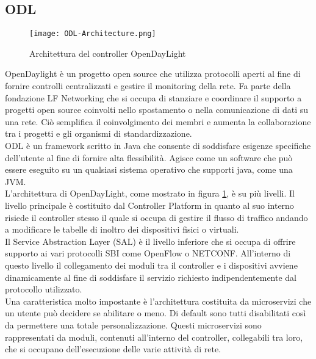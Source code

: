 \subsection{ODL}
\begin{figure}[h]
    \centering
   \texttt{[image: ODL-Architecture.png]}
    \caption{Architettura del controller OpenDayLight}
    \label{fig:ArchODL}
\end{figure}
OpenDaylight\cite{ODL} è un progetto open source che utilizza protocolli aperti al fine di fornire controlli centralizzati e gestire il monitoring della rete.
Fa parte della fondazione LF Networking \cite{LFN} che si occupa di stanziare e coordinare il supporto a progetti open source coinvolti nello spostamento o nella comunicazione di dati su una rete.
Ciò semplifica il coinvolgimento dei membri e aumenta la collaborazione tra i progetti e gli organismi di standardizzazione.
\\ODL è un framework scritto in Java che consente di soddisfare esigenze specifiche dell'utente al fine di fornire alta flessibilità. Agisce come un software che può essere eseguito su un qualsiasi sistema operativo che supporti java, come una JVM.
\\L'architettura di OpenDayLight, come mostrato in figura \ref{fig:ArchODL}, è su più livelli. 
Il livello principale è costituito dal Controller Platform in quanto al suo interno risiede il controller stesso il quale si 
occupa di gestire il flusso di traffico andando a modificare le tabelle di inoltro dei dispositivi fisici o virtuali. 
\\Il Service Abstraction Layer (SAL) è il livello inferiore che si occupa di offrire supporto ai vari protocolli SBI come OpenFlow o NETCONF. 
All'interno di questo livello il collegamento dei moduli tra il controller e i dispositivi avviene dinamicamente al fine di soddisfare il servizio richiesto indipendentemente dal protocollo utilizzato.
\\Una caratteristica molto impostante è l'architettura costituita da microservizi che un utente può decidere se abilitare o meno. 
Di default sono tutti disabilitati così da permettere una totale personalizzazione.
Questi microservizi sono rappresentati da moduli, contenuti all'interno del controller, collegabili tra loro, che si occupano dell'esecuzione delle varie attività di rete.

